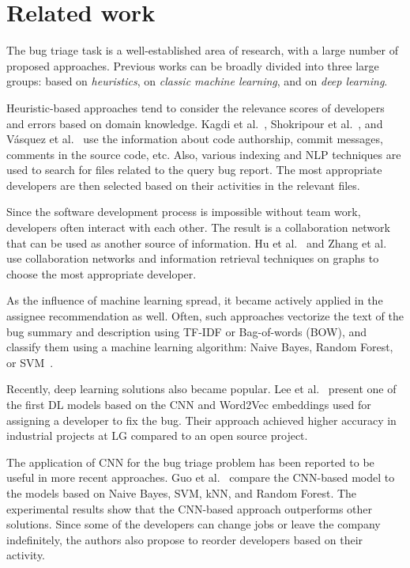 \section{Related work}\label{sec:related-work}

The bug triage task is a well-established area of research, with a large number of proposed approaches. Previous works can be broadly divided into three large groups: based on \textit{heuristics}, on \textit{classic machine learning}, and on \textit{deep learning}.

Heuristic-based approaches tend to consider the relevance scores of developers and errors based on domain knowledge. Kagdi et al.~\cite{Kagdi2012AssigningCR}, Shokripour et al.~\cite{Shokripour2012AutomaticBA, Shokripour2013WhySC}, and V{\'a}squez et al.~\cite{Vsquez2012TriagingIC} use the information about code authorship, commit messages, comments in the source code, etc. Also, various indexing and NLP techniques are used to search for files related to the query bug report. The most appropriate developers are then selected based on their activities in the relevant files.

Since the software development process is impossible without team work, developers often interact with each other. The result is a collaboration network that can be used as another source of information. Hu et al.~\cite{Hu2014EffectiveBT} and Zhang et al.~\cite{Zhang2013AHB} use collaboration networks and information retrieval techniques on graphs to choose the most appropriate developer. 

As the influence of machine learning spread, it became actively applied in the assignee recommendation as well. Often, such approaches vectorize the text of the bug summary and description using TF-IDF or Bag-of-words (BOW), and classify them using a machine learning algorithm: Naive Bayes, Random Forest, or SVM~\cite{Anvik2006WhoSF, Lin2009AnES, Banitaan2013TRAMAA, Ahsan2009AutomaticSB}. 

Recently, deep learning solutions also became popular. 
Lee et al.~\cite{Lee2017ApplyingDL} present one of the first DL models based on the CNN and Word2Vec embeddings used for assigning a developer to fix the bug. Their approach achieved higher accuracy in industrial projects at LG compared to an open source project.

The application of CNN for the bug triage problem has been reported to be useful in more recent approaches. Guo et al.~\cite{Guo2020DeveloperAM} compare the CNN-based model to the models based on Naive Bayes, SVM, kNN, and Random Forest. The experimental results show that the CNN-based approach outperforms other solutions. Since some of the developers can change jobs or leave the company indefinitely, the authors also propose to reorder developers based on their activity.

